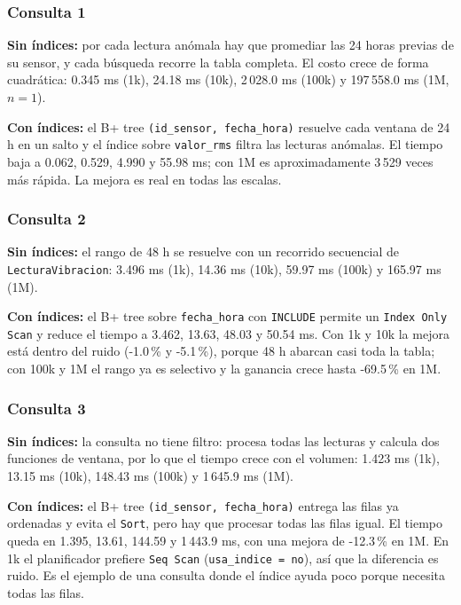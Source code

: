 \subsubsection{Consulta 1}

\textbf{Sin índices:} por cada lectura anómala hay que promediar las 24 horas
previas de su sensor, y cada búsqueda recorre la tabla completa. El costo crece
de forma cuadrática: 0.345 ms (1k), 24.18 ms (10k), 2\,028.0 ms (100k) y
197\,558.0 ms (1M, $n=1$).

\textbf{Con índices:} el B+ tree \texttt{(id\_sensor, fecha\_hora)} resuelve
cada ventana de 24 h en un salto y el índice sobre \texttt{valor\_rms} filtra
las lecturas anómalas. El tiempo baja a 0.062, 0.529, 4.990 y 55.98 ms; con
1M es aproximadamente 3\,529 veces más rápida. La mejora es real en todas las
escalas.


\subsubsection{Consulta 2}

\textbf{Sin índices:} el rango de 48 h se resuelve con un recorrido secuencial
de \texttt{LecturaVibracion}: 3.496 ms (1k), 14.36 ms (10k), 59.97 ms
(100k) y 165.97 ms (1M).

\textbf{Con índices:} el B+ tree sobre \texttt{fecha\_hora} con
\texttt{INCLUDE} permite un \texttt{Index Only Scan} y reduce el tiempo a
3.462, 13.63, 48.03 y 50.54 ms. Con 1k y 10k la mejora está dentro del
ruido (-1.0\,\% y -5.1\,\%), porque 48 h abarcan casi toda la tabla; con 100k y 1M el
rango ya es selectivo y la ganancia crece hasta -69.5\,\% en 1M.


\subsubsection{Consulta 3}

\textbf{Sin índices:} la consulta no tiene filtro: procesa todas las lecturas y
calcula dos funciones de ventana, por lo que el tiempo crece con el volumen:
1.423 ms (1k), 13.15 ms (10k), 148.43 ms (100k) y 1\,645.9 ms (1M).

\textbf{Con índices:} el B+ tree \texttt{(id\_sensor, fecha\_hora)} entrega las
filas ya ordenadas y evita el \texttt{Sort}, pero hay que procesar todas las
filas igual. El tiempo queda en 1.395, 13.61, 144.59 y 1\,443.9 ms, con una
mejora de -12.3\,\% en 1M. En 1k el planificador prefiere \texttt{Seq Scan}
(\texttt{usa\_indice = no}), así que la diferencia es ruido. Es el ejemplo de
una consulta donde el índice ayuda poco porque necesita todas las filas.


